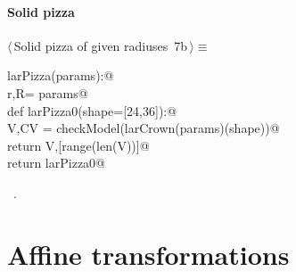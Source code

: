 \documentclass[11pt,oneside]{article}	%
\begin{document}
\paragraph{Solid pizza}
\begin{flushleft} \small \label{scrap15}
\protect{}$\langle\,$Solid pizza of given radiuses\nobreak\ {\footnotesize 7b}$\,\rangle\equiv$
\vspace{-1ex}
\begin{list}{}{} \item
\mbox{}\verb@def larPizza(params):@\\
\mbox{}\verb@   r,R= params@\\
\mbox{}\verb@   def larPizza0(shape=[24,36]):@\\
\mbox{}\verb@      V,CV = checkModel(larCrown(params)(shape))@\\
\mbox{}\verb@      return V,[range(len(V))]@\\
\mbox{}\verb@   return larPizza0@\\
\mbox{}\verb@@{\NWsep}
\end{list}
\vspace{-1ex}
\footnotesize\addtolength{\baselineskip}{-1ex}
\begin{list}{}{\setlength{\itemsep}{-\parsep}\setlength{\itemindent}{-\leftmargin}}
\item \NWtxtMacroRefIn\ .
\end{list}
\end{flushleft}
\section{Affine transformations}
\end{document}
